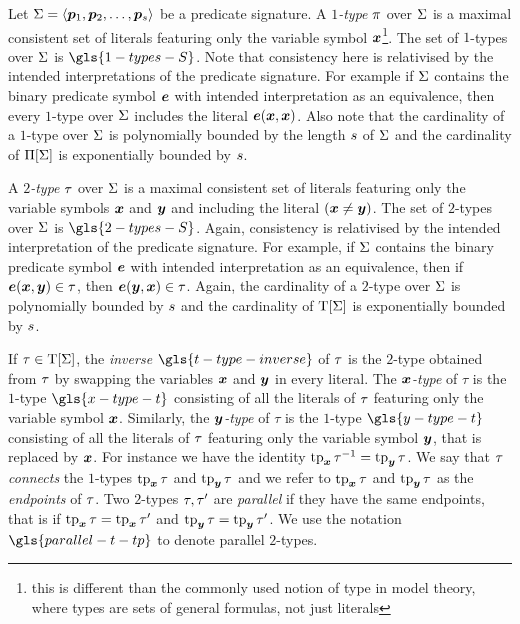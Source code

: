 Let $\mathrm{\Sigma} = \left\langle \bm{p}_{1}, \bm{p}_{2}, \dots, \bm{p}_{s} \right\rangle$ be a predicate signature.
A \emph{$1$-type} $\pi$ over $\mathrm{\Sigma}$ is a maximal consistent set of literals
featuring only the variable symbol $\bm{x}$\footnote{this is different than the
commonly used notion of type in model theory, where types are sets of general
formulas, not just literals}.
The set of $1$-types over $\mathrm{\Sigma}$ is $\gls{1-types-S}$.
Note that consistency here is relativised by the intended interpretations of the
predicate signature. For example if $\mathrm{\Sigma}$ contains the binary predicate symbol
$\bm{e}$ with intended interpretation as an equivalence, then every $1$-type over
$\mathrm{\Sigma}$ includes the literal $\bm{e}(\bm{x},\bm{x})$.
Also note that the cardinality of a $1$-type over $\mathrm{\Sigma}$ is polynomially
bounded by the length $s$ of $\mathrm{\Sigma}$ and the cardinality of $\Pi[\mathrm{\Sigma}]$ is
exponentially bounded by $s$.

A \emph{$2$-type} $\tau$ over $\mathrm{\Sigma}$ is a maximal consistent set of literals
featuring only the variable symbols $\bm{x}$ and $\bm{y}$ and including the literal
$(\bm{x} \neq \bm{y})$.
The set of $2$-types over $\mathrm{\Sigma}$ is $\gls{2-types-S}$.
Again, consistency is relativised by the intended interpretation of the
predicate signature.
For example, if $\mathrm{\Sigma}$ contains the binary predicate
symbol $\bm{e}$ with intended interpretation as an equivalence,
then if $\bm{e}(\bm{x}, \bm{y}) \in \tau$, then $\bm{e}(\bm{y}, \bm{x}) \in \tau$.
Again, the cardinality of a $2$-type over $\mathrm{\Sigma}$ is polynomially bounded by
$s$ and the cardinality of $\mathrm{T}[\mathrm{\Sigma}]$ is exponentially bounded by
$s$.

If $\tau \in \mathrm{T}[\mathrm{\Sigma}]$, the \emph{inverse} $\gls{t-type-inverse}$ of $\tau$
is the $2$-type obtained from $\tau$ by
swapping the variables $\bm{x}$ and $\bm{y}$ in every literal.
The \emph{$\bm{x}$-type} of $\tau$ is the $1$-type $\gls{x-type-t}$
consisting of all the literals of $\tau$ featuring only the variable symbol
$\bm{x}$. Similarly, the \emph{$\bm{y}$-type} of $\tau$ is the $1$-type
$\gls{y-type-t}$ consisting of all the literals of $\tau$ featuring only the
variable symbol $\bm{y}$, that is replaced by $\bm{x}$.
For instance we have the identity $\operatorname{tp}_{\bm{x}}\tau^{-1} = \operatorname{tp}_{\bm{y}}\tau$.
We say that $\tau$ \emph{connects} the $1$-types $\operatorname{tp}_{\bm{x}}\tau$ and $\operatorname{tp}_{\bm{y}}\tau$
and we refer to $\operatorname{tp}_{\bm{x}}\tau$ and $\operatorname{tp}_{\bm{y}}\tau$ as the \emph{endpoints} of $\tau$.
Two $2$-types $\tau,{\tau'}$ are \emph{parallel} if they have the same
endpoints, that is if $\operatorname{tp}_{\bm{x}}\tau = \operatorname{tp}_{\bm{x}}{\tau'}$ and $\operatorname{tp}_{\bm{y}}\tau = \operatorname{tp}_{\bm{y}}{\tau'}$.
We use the notation $\gls{parallel-t-tp}$ to denote parallel $2$-types.

